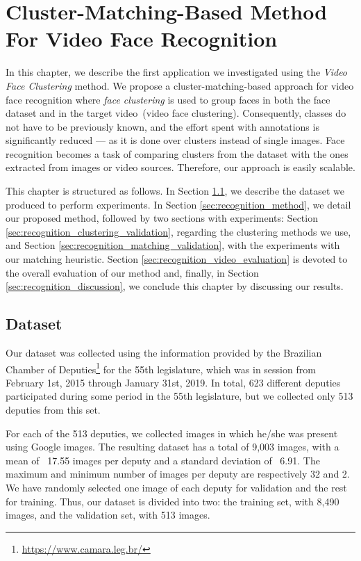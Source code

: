 \newpage
\chapter{Cluster-Matching-Based Method For Video Face Recognition}
\label{chap:face_recognition}

In this chapter, we describe the first application we investigated using the \emph{Video Face Clustering} method.
We propose a cluster-matching-based approach for video face recognition where \emph{face clustering} is used to group faces in both the face dataset and in the target video~(video face clustering).
Consequently, classes do not have to be previously known, and the effort spent with annotations is significantly reduced --- as it is done over clusters instead of single images.
Face recognition becomes a task of comparing clusters from the dataset with the ones extracted from images or video sources.
Therefore, our approach is easily scalable.

This chapter is structured as follows. 
In Section \ref{sec:recognition_dataset}, we describe the dataset we produced to perform experiments. 
In Section \ref{sec:recognition_method}, we detail our proposed method, followed by two sections with experiments: 
Section \ref{sec:recognition_clustering_validation}, regarding the clustering methods we use, and 
Section \ref{sec:recognition_matching_validation}, with the experiments with our matching heuristic.
Section \ref{sec:recognition_video_evaluation} is devoted to the overall evaluation of our method and, finally, 
in Section \ref{sec:recognition_discussion}, we conclude this chapter by discussing our results.

\section{Dataset}
\label{sec:recognition_dataset}
Our dataset was collected using the information provided by the Brazilian Chamber of Deputies\footnote{\url{https://www.camara.leg.br/}} for the 55th legislature, which was in session from February 1st, 2015 through January 31st, 2019.
In total, 623 different deputies participated during some period in the 55th legislature, but we collected only 513 deputies from this set.

For each of the 513 deputies, we collected images in which he/she was present using Google images.
The resulting dataset has a total of 9,003 images, with a mean of ~17.55 images per deputy and a standard deviation of ~6.91. 
The maximum and minimum number of images per deputy are respectively 32 and 2.
We have randomly selected one image of each deputy for validation and the rest for training.
Thus, our dataset is divided into two: the training set, with 8,490 images, and the validation set, with 513 images.  


